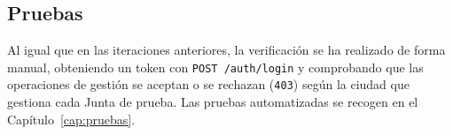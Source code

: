 
\subsection{Pruebas}

Al igual que en las iteraciones anteriores, la verificación se ha realizado de forma manual, obteniendo un token con \texttt{POST /auth/login} y comprobando que las operaciones de gestión se aceptan o se rechazan (\texttt{403}) según la ciudad que gestiona cada Junta de prueba. Las pruebas automatizadas se recogen en el Capítulo~\ref{cap:pruebas}.
